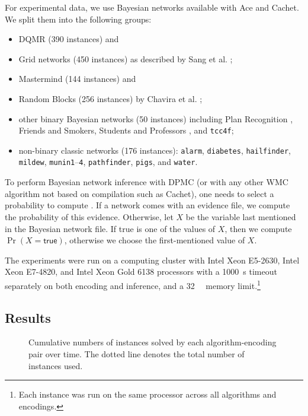 \documentclass[runningheads]{llncs}
\begin{document}
For experimental data, we use Bayesian networks available with \textsf{Ace} and
\textsf{Cachet}. We split them into the following groups:
\begin{itemize}
\item DQMR (390 instances) and
\item Grid networks (450 instances) as described by Sang et al.
  \cite{DBLP:conf/aaai/SangBK05};
\item Mastermind (144 instances) and
\item Random Blocks (256 instances) by Chavira et al.
  \cite{DBLP:journals/ijar/ChaviraDJ06};
\item other binary Bayesian networks (50 instances) including Plan Recognition
  \cite{DBLP:conf/aaai/SangBK05}, Friends and Smokers, Students and Professors
  \cite{DBLP:journals/ijar/ChaviraDJ06}, and \texttt{tcc4f};
\item non-binary classic networks (176 instances): \texttt{alarm},
  \texttt{diabetes}, \texttt{hailfinder}, \texttt{mildew},
  \texttt{munin1}--\texttt{4}, \texttt{pathfinder}, \texttt{pigs}, and
  \texttt{water}.
\end{itemize}

To perform Bayesian network inference with \textsf{DPMC} (or with any
other WMC algorithm not based on compilation such as \textsf{Cachet}), one
needs to select a probability to compute
\cite{DBLP:conf/cp/DudekPV20,DBLP:conf/sat/SangBBKP04}. If a network comes
with an evidence file, we compute the probability of this evidence. Otherwise,
let $X$ be the variable last mentioned in the Bayesian network file. If
\textsf{true} is one of the values of $X$, then we compute $\Pr(X =
\textsf{true})$, otherwise we choose the first-mentioned value of $X$.

The experiments were run on a computing cluster with Intel Xeon E5-2630,
Intel Xeon E7-4820, and Intel Xeon Gold 6138 processors with a
\SI{1000}{\second} timeout separately on both encoding and inference, and a
\SI{32}{\gibi\byte} memory limit.\footnote{Each instance was run on the same
  processor across all algorithms and encodings.}

\subsection{Results}

\begin{figure}
  \centering
  \caption{Cumulative numbers of instances solved by each algorithm-encoding
    pair over time. The dotted line denotes the total number of instances used.}
  \label{fig:cumulative}
\end{figure}
\end{document}
